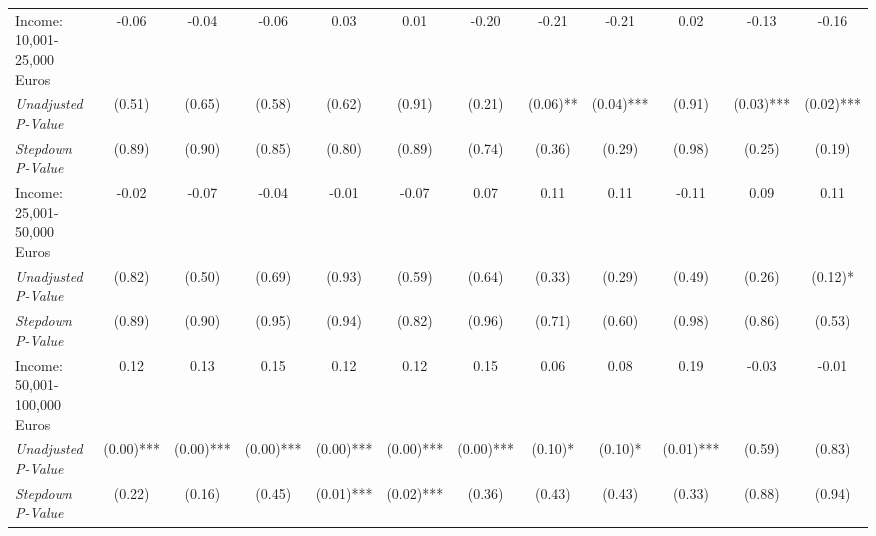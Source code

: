 \begin{tabular}{l c c c c c c c c c c c}
Income: 10,001-25,000 Euros & -0.06 & -0.04 & -0.06 & 0.03 & 0.01 & -0.20 & -0.21 & -0.21 & 0.02 & -0.13 & -0.16 \\
\quad \textit{Unadjusted P-Value} & (0.51) & (0.65) & (0.58) & (0.62) & (0.91) & (0.21) & (0.06)** & (0.04)*** & (0.91) & (0.03)*** & (0.02)*** \\
\quad \textit{Stepdown P-Value} & (0.89) & (0.90) & (0.85) & (0.80) & (0.89) & (0.74) & (0.36) & (0.29) & (0.98) & (0.25) & (0.19) \\
Income: 25,001-50,000 Euros & -0.02 & -0.07 & -0.04 & -0.01 & -0.07 & 0.07 & 0.11 & 0.11 & -0.11 & 0.09 & 0.11 \\
\quad \textit{Unadjusted P-Value} & (0.82) & (0.50) & (0.69) & (0.93) & (0.59) & (0.64) & (0.33) & (0.29) & (0.49) & (0.26) & (0.12)* \\
\quad \textit{Stepdown P-Value} & (0.89) & (0.90) & (0.95) & (0.94) & (0.82) & (0.96) & (0.71) & (0.60) & (0.98) & (0.86) & (0.53) \\
Income: 50,001-100,000 Euros & 0.12 & 0.13 & 0.15 & 0.12 & 0.12 & 0.15 & 0.06 & 0.08 & 0.19 & -0.03 & -0.01 \\
\quad \textit{Unadjusted P-Value} & (0.00)*** & (0.00)*** & (0.00)*** & (0.00)*** & (0.00)*** & (0.00)*** & (0.10)* & (0.10)* & (0.01)*** & (0.59) & (0.83) \\
\quad \textit{Stepdown P-Value} & (0.22) & (0.16) & (0.45) & (0.01)*** & (0.02)*** & (0.36) & (0.43) & (0.43) & (0.33) & (0.88) & (0.94) \\
\bottomrule
\end{tabular}
